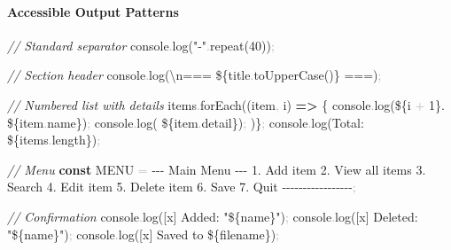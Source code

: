 \documentclass[
  justified,
  openright,
]{tufte-book}
\let\subsection\paragraph
\let\paragraph\paragraph
\newcommand{\KeywordTok}[1]{\textcolor{CodeKeyword}{\textbf{#1}}}  %
\newcommand{\StringTok}[1]{\textcolor{CodeString}{#1}}              %
\newcommand{\CommentTok}[1]{\textcolor{CodeComment}{\textit{#1}}}  %
\newcommand{\CodeNumTok}[1]{\textcolor{CodeNumber}{#1}}             %
\newcommand{\CodeFuncTok}[1]{\textcolor{CodeKeyword}{#1}}           %
\newcommand{\CodeTypeTok}[1]{\textcolor{CodeType}{#1}}              %
\newcommand{\OperatorTok}[1]{\textcolor{DarkGray}{#1}}              %
\newenvironment{Shaded}{%
  \begin{mdframed}[style=TufteCode]%
}{%
  \end{mdframed}%
}
\let\subsection\paragraph
\let\paragraph\paragraph
\begin{document}
\subsection{Accessible Output
Patterns}\label{accessible-output-patterns-1}

\begin{Shaded}
\begin{Highlighting}[]
\CommentTok{// Standard separator}
console\OperatorTok{.}\CodeFuncTok{log}(\StringTok{"{-}"}\OperatorTok{.}\CodeFuncTok{repeat}(\CodeNumTok{40}))\OperatorTok{;}
 
\CommentTok{// Section header}
console\OperatorTok{.}\CodeFuncTok{log}(\StringTok{\textasciigrave{}}\StringTok{\textbackslash{}n}\StringTok{=== }\StringTok{\$\{}title\OperatorTok{.}\CodeFuncTok{toUpperCase}()\StringTok{\}}\StringTok{ ===\textasciigrave{}})\OperatorTok{;}
 
\CommentTok{// Numbered list with details}
items\OperatorTok{.}\CodeFuncTok{forEach}((item\OperatorTok{,} i) \KeywordTok{=\textgreater{}} \{
  console\OperatorTok{.}\CodeFuncTok{log}(\StringTok{\textasciigrave{}}\StringTok{\$\{}i \OperatorTok{+} \CodeNumTok{1}\StringTok{\}}\StringTok{. }\StringTok{\$\{}item\OperatorTok{.}\CodeTypeTok{name}\StringTok{\}}\StringTok{\textasciigrave{}})\OperatorTok{;}
  console\OperatorTok{.}\CodeFuncTok{log}(\StringTok{\textasciigrave{}   }\StringTok{\$\{}item\OperatorTok{.}\CodeTypeTok{detail}\StringTok{\}}\StringTok{\textasciigrave{}})\OperatorTok{;}
)\}\OperatorTok{;}
console\OperatorTok{.}\CodeFuncTok{log}(\StringTok{\textasciigrave{}Total: }\StringTok{\$\{}items\OperatorTok{.}\CodeTypeTok{length}\StringTok{\}}\StringTok{\textasciigrave{}})\OperatorTok{;}
 
\CommentTok{// Menu}
\KeywordTok{const} MENU \OperatorTok{=} \StringTok{\textasciigrave{}}
\StringTok{{-}{-}{-} Main Menu {-}{-}{-}}
\StringTok{1. Add item}
\StringTok{2. View all items}
\StringTok{3. Search}
\StringTok{4. Edit item}
\StringTok{5. Delete item}
\StringTok{6. Save}
\StringTok{7. Quit}
\StringTok{{-}{-}{-}{-}{-}{-}{-}{-}{-}{-}{-}{-}{-}{-}{-}{-}{-}\textasciigrave{}}\OperatorTok{;}
 
\CommentTok{// Confirmation}
console\OperatorTok{.}\CodeFuncTok{log}(\StringTok{\textasciigrave{}[x] Added: "}\StringTok{\$\{}name\StringTok{\}}\StringTok{"\textasciigrave{}})\OperatorTok{;}
console\OperatorTok{.}\CodeFuncTok{log}(\StringTok{\textasciigrave{}[x] Deleted: "}\StringTok{\$\{}name\StringTok{\}}\StringTok{"\textasciigrave{}})\OperatorTok{;}
console\OperatorTok{.}\CodeFuncTok{log}(\StringTok{\textasciigrave{}[x] Saved to }\StringTok{\$\{}filename\StringTok{\}}\StringTok{\textasciigrave{}})\OperatorTok{;}
 

\end{Highlighting}
\end{Shaded}
\end{document}
